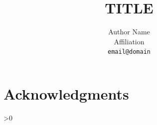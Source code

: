 \documentclass[11pt]{article}
\title{TITLE}
\author{Author Name \\ Affiliation \\ \texttt{email@domain}}
\begin{document}
\maketitle

\begin{abstract}

\end{abstract}










\ifdefined\PaperModeFinal
\section*{Acknowledgments}
\fi

>0 \fi

\appendix

\end{document}
